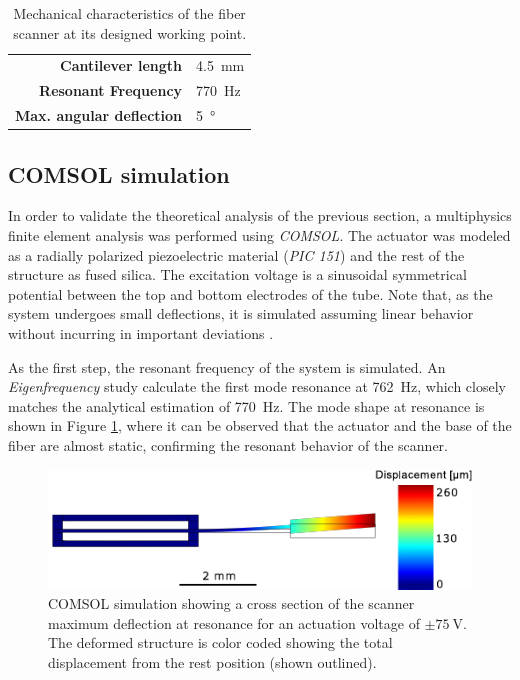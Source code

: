 \documentclass[10pt]{iopart}
\begin{document}
\begin{table}[h!]\centering
	\caption{Mechanical characteristics of the fiber scanner at its designed working point.}
	\begin{tabular}{rl}\\
		\hline
		\textbf{Cantilever length} & \SI{4.5}{\milli\meter} \\ 
		\textbf{Resonant Frequency} & \SI{770}{\hertz} \\ 
		\textbf{Max. angular deflection} & \SI{5}{\degree} \\ 
		\hline
	\end{tabular} 
    \label{tab:mech}
\end{table}

\subsection{COMSOL simulation}

In order to validate the theoretical analysis of the previous section, a multiphysics finite element analysis was performed using \textit{COMSOL}. The actuator was modeled as a radially polarized piezoelectric material (\textit{PIC 151}) and the rest of the structure as fused silica. The excitation voltage is a sinusoidal symmetrical potential between the top and bottom electrodes of the tube. Note that, as the system undergoes small deflections, it is simulated assuming linear behavior without incurring in important deviations \cite{Fertis2006}.

As the first step, the resonant frequency of the system is simulated. An \textit{Eigenfrequency} study calculate the first mode resonance at \SI{762}{\hertz}, which closely matches the analytical estimation of \SI{770}{\hertz}. The mode shape at resonance is shown in Figure \ref{fig:defle}, where it can be observed that the actuator and the base of the fiber are almost static, confirming the resonant behavior of the scanner.

\begin{figure}[h!]\centering
      \includegraphics[width=\columnwidth]{figures/deflection.pdf}
      \caption{COMSOL simulation showing a cross section of the scanner maximum deflection at resonance for an actuation voltage of $\pm \SI{75}{\volt}$. The deformed structure is color coded showing the total displacement from the rest position (shown outlined). }
      \label{fig:defle}
\end{figure}
\end{document}
